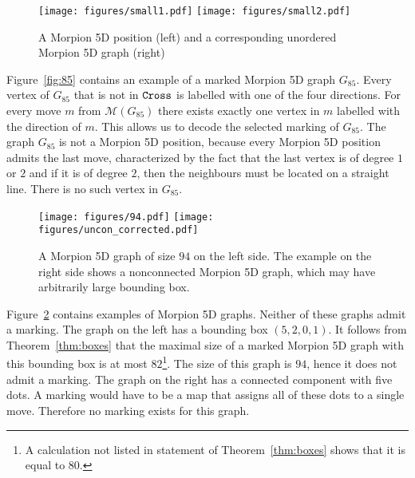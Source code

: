 \begin{figure}
    \texttt{[image: figures/small1.pdf]}
    \texttt{[image: figures/small2.pdf]}
    \caption{\label{fig:small}
      A Morpion 5D position (left) and a corresponding unordered Morpion 5D graph (right)
    }
\end{figure}
 
\begin{example}
Figure~\ref{fig:85} contains an example of a marked Morpion 5D graph $G_{85}$. 
Every vertex of $G_{85}$ that is not in $\texttt{Cross}$ is labelled with one of the four directions. 
For every move $m$ from $\mathcal{M}(G_{85})$ there exists exactly one vertex in $m$ 
  labelled with the direction of $m$.
This allows us to decode the selected marking of $G_{85}$.
The graph $G_{85}$ is not a Morpion 5D position,  because every Morpion 5D position admits the last move, characterized by the fact that the last vertex is of degree $1$ or $2$ and if it is
of degree $2$, then the neighbours must be located on a straight line. 
There is no such vertex in $G_{85}$.
\end{example}

\begin{figure}
  \centering
    \texttt{[image: figures/94.pdf]}
    \texttt{[image: figures/uncon\_corrected.pdf]}
  \caption{
    A Morpion 5D graph of size $94$ on the left side. 
    The example on the right side shows a nonconnected Morpion 5D graph,
      which may have arbitrarily large bounding box.
  }
  \label{fig:uncon}
\end{figure}

Figure~\ref{fig:uncon} contains examples of Morpion 5D graphs.
Neither of these graphs admit a marking.
The graph on the left has a bounding box $(5,2,0,1)$.
It follows from Theorem~\ref{thm:boxes} that the maximal size of a marked Morpion 5D graph with this 
  bounding box is at most $82$\footnote{A calculation not listed in statement of Theorem~\ref{thm:boxes} shows that it is equal to $80$.}.
The size of this graph is $94$, hence it does not admit a marking.
The graph on the right has a connected component with five dots.
A marking would have to be a map that assigns all of these dots to a single move.
Therefore no marking exists for this graph.

